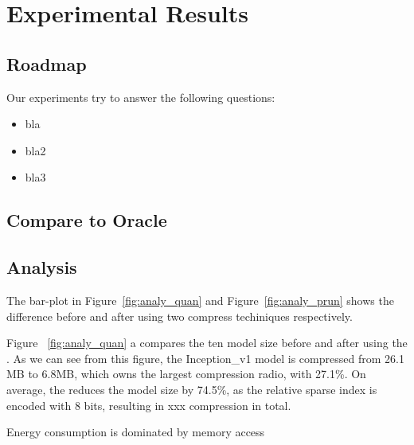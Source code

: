 \section{Experimental Results}


\subsection{Roadmap}
Our experiments try to answer the following questions:

\begin{itemize}
\item bla
\item bla2
\item bla3
\end{itemize}




\subsection{Compare to Oracle}


\subsection{Analysis}
The bar-plot in Figure~\ref{fig:analy_quan} and Figure~\ref{fig:analy_prun}
shows the difference before and after using two compress techiniques respectively.


Figure ~\ref{fig:analy_quan} a
compares the ten model size before and after using the \quantization.
As we can see from this figure, the Inception\_v1 model is
compressed from 26.1 MB to 6.8MB, which 
owns the largest compression radio, with 27.1\%.
On average, the \quantization reduces the model size by 74.5\%, 
as the relative sparse index is encoded with 8 bits, resulting in 
xxx compression in total.




Energy consumption is dominated by memory access

